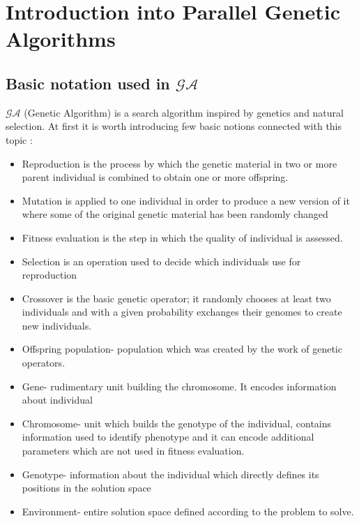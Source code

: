 \section{Introduction into Parallel Genetic Algorithms}
\label{cha:teoria}
\subsection{Basic notation used in $\mathcal{GA}$}
\label{cha:BasicNotation}
$\mathcal{GA}$ (Genetic Algorithm) is a search algorithm inspired by genetics and
natural selection. At first it is worth introducing few basic notions connected
with this topic \cite{bib10}:
\begin{itemize}
	\item Reproduction is the process by which the genetic material in two or
		more parent individual is combined to obtain one or more offspring.
	\item Mutation is applied to one individual in order to produce a new
		version of it where some of the original genetic material has been
		randomly changed
	\item Fitness evaluation is the step in which the quality of individual is
		assessed.
	\item Selection is an operation used to decide which individuals use for
		reproduction
	\item Crossover is the basic genetic operator; it randomly chooses at least two
		individuals and with a given probability exchanges their genomes to
		create new individuals. 
	\item Offspring population- population which was created by the work of
		genetic operators.
	\item Gene- rudimentary unit building the chromosome. It encodes information
		about individual
	\item Chromosome- unit which builds the genotype of the individual, contains
		information used to identify phenotype and it can encode additional
		parameters which are not used in fitness evaluation. 
	\item Genotype- information about the individual which directly defines its
		positions in the solution space 
	\item Environment- entire solution space defined according to the problem to solve. 
\end{itemize}

